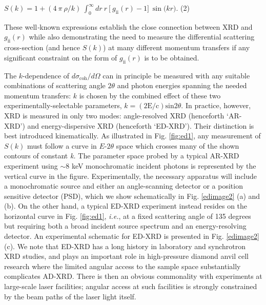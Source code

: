 \(S\left( k \right) = 1 + (4\ \pi\ \rho/k)\ \int_{0}^{\infty}{dr\ r\ \lbrack\ g_{\text{ii}}\left( r \right) - 1\rbrack}\ \sin{(kr})\).
(2)

These well\emph{-}known expressions establish the close connection
between XRD and \(g_{\text{ii}}\left( r \right)\) while also
demonstrating the need to measure the differential scattering
cross-section (and hence \(S(k)\)) at many different momentum transfers
if any significant constraint on the form of
\(g_{\text{ii}}\left( r \right)\) is to be obtained.

The \(k\)-dependence of \(d\sigma_{\text{coh}}/d\Omega\) can in
principle be measured with any suitable combinations of scattering angle
\(2\theta\) and photon energies spanning the needed momentum transfers:
\(k\) is chosen by the combined effect of these two
experimentally-selectable parameters,
\(k = \operatorname{(2E/c)sin}{2\theta}\). In practice, however, XRD is
measured in only two modes: angle-resolved XRD (henceforth `AR-XRD') and
energy-dispersive XRD (henceforth `ED-XRD'). Their distinction is best
introduced kinematically. As illustrated in Fig. \ref{fig:ed1}, any measurement of
\(S(k)\) must follow a curve in \(E\)-\(2\theta\) space which crosses
many of the shown contours of constant \emph{k.} The parameter space
probed by a typical AR-XRD experiment using $\sim 8$ keV
monochromatic incident photons is represented by the vertical curve in
the figure. Experimentally, the necessary apparatus will include a
monochromatic source and either an angle-scanning detector or a position
sensitive detector (PSD), which we show schematically in Fig. \ref{edimage2} (a) and
(b). On the other hand, a typical ED-XRD experiment instead resides on
the horizontal curve in Fig. \ref{fig:ed1}, \emph{i.e.}, at a fixed scattering angle
of 135 degrees but requiring both a broad incident source spectrum and
an energy-resolving detector. An experimental schematic for ED-XRD is
presented in Fig. \ref{edimage2}(c). We note that ED-XRD has a long history in
laboratory and synchrotron XRD studies, and plays an important role in
high-pressure diamond anvil cell research where the limited angular
access to the sample space substantially complicates
AD-XRD. \cite{FENG2005ENERGY, HOIDN2014PHOTOMETRIC, FENG2007PRESSURE, DESGRENIERS1989TIN, BAUBLITZ1981ENERGY}
There is then an obvious commonality with experiments at large-scale
laser facilities; angular access at such facilities is strongly
constrained by the beam paths of the laser light itself.


